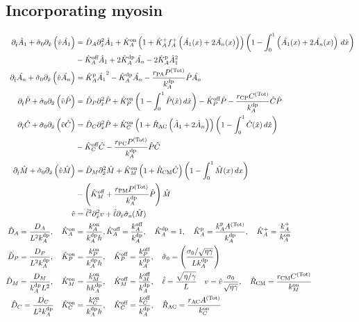 \documentclass[11pt]{article}
\newcommand{\6}[1]{#1_{\text{6}}}
\newcommand{\3}[1]{#1_{\text{3}}}
\newcommand{\Tot}[1]{#1^\text{(Tot)}}
\newcommand{\A}[1]{#1_A}
\newcommand{\My}[1]{#1_M}
\begin{document}
\subsection{Incorporating myosin}
\begin{subequations}
\label{eq:Everything}
\begin{align}
\nonumber
\Dthat \hat{A}_1 +\hat{\sigma}_0  \Dxhat \left(\hat{v} \hat{\MA} \right)   &=\DhatA \Dxhat^2 \hat{A}_1 +\KhatonA\left(1+\hat{K}_A^+ f_A^+\left(\hat{\MA}(x) + 2\hat{\PA}(x)\right)\right)\left(1 - \int_0^1 \left(\hat{\MA}(x) + 2\hat{\PA}(x)\right) \, d\hat{x} \right) \\  
 &-\KhatoffA \hat{A}_1 +2\KhatdpA \hat{\PA}-2 \KhatpA \hat{A}_1^2 \\ 
\Dthat \hat{\PA} +\hat{\sigma}_0  \Dxhat \left(\hat{v} \hat{\PA} \right)  &=\KhatpA \hat{\MA}^2- \KhatdpA \hat{\PA}-\frac{r_\text{PA} \Tot{P}}{\kdp_A}\hat{P}\hat{\PA} \\ 
\Dthat \hat{P} +\hat{\sigma}_0  \Dxhat \left(\hat{v} \hat{P} \right)  &=\DhatP \Dxhat^2 \hat{P}+\KhatonP \left(1 - \int_0^1 \hat{P}(\hat x) \, d\hat{x} \right)  - \KhatoffP \hat{P}-\frac{r_\text{CP} \Tot{C}}{\kdp_A}\hat{C}\hat{P} \\  \nonumber
\Dthat \hat{C}+\hat{\sigma}_0  \Dxhat \left(\hat{v} \hat{C} \right)  &=\DhatC \Dxhat^2 \hat{P} +\KhatonC \left(1+\hat R_\text{AC}\left(\hat A_1+2\hat A_n\right) \right)\left(1 - \int_0^1 \hat{C}(\hat x) \, d\hat{x} \right)  \\ &- \KhatoffC \hat{C}-\frac{r_\text{PC} \Tot{P}}{\kdp_A}\hat P \hat{C} \\ 
\nonumber
\Dthat \hat{M} +\hat{\sigma}_0  \Dxhat \left(\hat{v} \hat{M} \right) &=\hat{D}_M \Dxhat^2 \hat{M} +\KhatonM \left(1+\hat{R}_\text{CM} \hat C\right) \left(1-\int_0^1  \hat{M}(x) \, dx\right) \\ &- \left(\KhatoffM+\frac{r_\text{PM}\Tot{P}}{\kdp_A}\hat{P} \right) \hat{M}\\
\hat{v} &= \hat{\ell}^2 \Dxhat^2 v +\hat{\ell} \Dxhat \hat{\sigma}_a(\hat{M})\\ \nonumber
\DhatA =\frac{\A{D}}{L^2 \A{\kdp}}, \quad \KhatonA &=\frac{\A{\kon}}{\A{\kdp} h }, \KhatoffA = \frac{\koff_A}{\kdp_A}, \quad \KhatdpA =1, \quad \KhatpA = \frac{\A{\kp} \Tot{A}}{\A{\kdp}}, \quad \KhatfA = \frac{\A{\kf}}{\A{\kon}} \\
\DhatP =\frac{D_P}{L^2 \A{\kdp}}, \quad \KhatonP &=\frac{{\kon_P}}{\A{\kdp} h }, \quad \KhatoffP = \frac{\koff_P}{\kdp_A}, \quad \hat{\sigma}_0 = \left(\frac{\sigma_0/ \sqrt{\eta \gamma} }{L {\kdp_A}}\right)   \\ \nonumber
 \hat{D}_M =\frac{D_M}{{\kdp_A}  L^2}, \quad \KhatonM &= \frac{\My{\kon}}{h {\kdp_A}}, \quad \KhatoffM = \frac{\koff_M}{\kdp_A}, \quad  \hat{\ell} = \frac{\sqrt{\eta/\gamma}}{L} \quad v = \hat{v} \frac{\sigma_0}{\sqrt{\eta \gamma}}, \quad \hat R_\text{CM}=\frac{r_\text{CM}\Tot{C}}{\kon_M} \\ \nonumber
\DhatC =\frac{D_C}{L^2 \A{\kdp}} \quad \KhatonC &=\frac{{\kon_C}}{\A{\kdp} h },\quad \KhatoffC = \frac{\koff_C}{\kdp_A},\quad \hat{R}_\text{AC}=\frac{r_\text{AC}\Tot{A}}{\kon_C}
\end{align}
\end{subequations}
\end{document}
